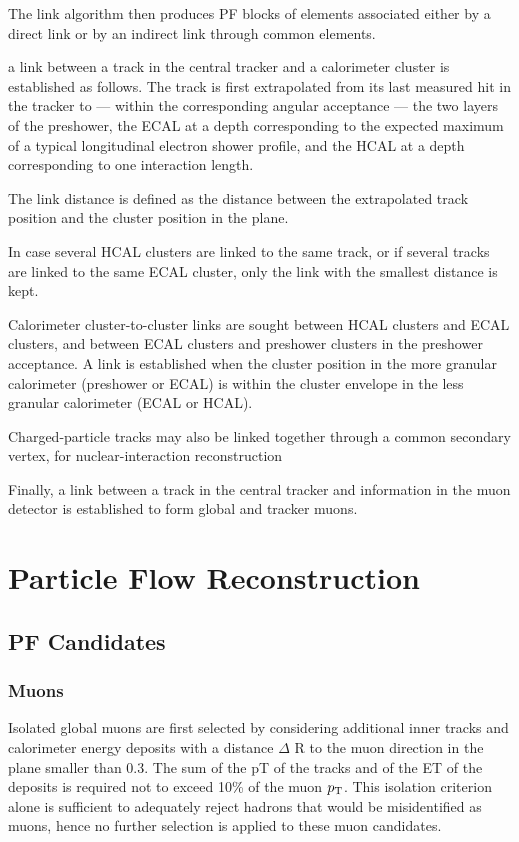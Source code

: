 The link algorithm then produces PF blocks of elements associated either by a direct link or by an indirect link through common elements.

a link between a track in the central tracker and a calorimeter cluster is established as follows. The track is first extrapolated from its last measured hit in the tracker to — within the corresponding angular acceptance — the two layers of the preshower, the ECAL at a depth corresponding to the expected maximum of a typical longitudinal electron shower profile, and the HCAL at a depth corresponding to one interaction length.

The link distance is defined as the distance between the extrapolated track position and the cluster position in the \etaphi plane.

In case several HCAL clusters are linked to the same track, or if several tracks are linked to the same ECAL cluster, only the link with the smallest distance is kept.

Calorimeter cluster-to-cluster links are sought between HCAL clusters and ECAL clusters, and between ECAL clusters and preshower clusters in the preshower acceptance. A link is established when the cluster position in the more granular calorimeter (preshower or ECAL) is within the cluster envelope in the less granular calorimeter (ECAL or HCAL).

Charged-particle tracks may also be linked together through a common secondary vertex, for nuclear-interaction reconstruction

Finally, a link between a track in the central tracker and information in the muon detector is established to form global and tracker muons.

\section{Particle Flow Reconstruction}
\subsection{PF Candidates}
\subsubsection{Muons}

Isolated global muons are first selected by considering additional inner tracks and calorimeter 
energy deposits with a distance $\Delta$ R to the muon direction in the \etaphi plane smaller than 0.3. 
The sum of the pT of the tracks and of the ET of the deposits is required not to exceed 10\% of the 
muon $p_\mathrm{T}$. This isolation criterion alone is sufficient to adequately reject hadrons that would be 
misidentified as muons, hence no further selection is applied to these muon candidates.

